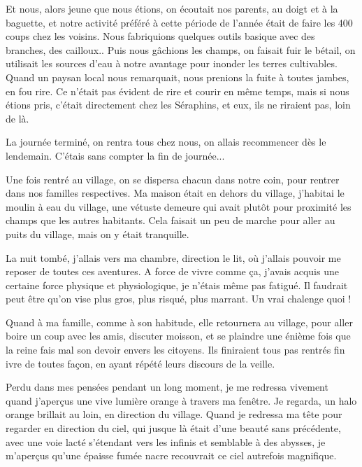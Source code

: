 \documentclass{book}
\begin{document}
Et nous, alors jeune que nous étions, on écoutait nos parents, au doigt et à la baguette, et notre activité préféré à cette période de l'année était de faire les 400 coups chez les voisins. Nous fabriquions quelques outils basique avec des branches, des cailloux.. Puis nous gâchions les champs, on faisait fuir le bétail, on utilisait les sources d'eau à notre avantage pour inonder les terres cultivables. Quand un paysan local nous remarquait, nous prenions la fuite à toutes jambes, en fou rire. Ce n'était pas évident de rire et courir en même temps, mais si nous étions pris, c'était directement chez les Séraphins, et eux, ils ne riraient pas, loin de là.\newline

La journée terminé, on rentra tous chez nous, on allais recommencer dès le lendemain. C'étais sans compter la fin de journée...\newline

Une fois rentré au village, on se dispersa chacun dans notre coin, pour rentrer dans nos familles respectives. Ma maison était en dehors du village, j'habitai le moulin à eau du village, une vétuste demeure qui avait plutôt pour proximité les champs que les autres habitants. Cela faisait un peu de marche pour aller au puits du village, mais on y était tranquille.\newline

La nuit tombé, j'allais vers ma chambre, direction le lit, où j'allais pouvoir me reposer de toutes ces aventures. A force de vivre comme ça, j'avais acquis une certaine force physique et physiologique, je n'étais même pas fatigué. Il faudrait peut être qu'on vise plus gros, plus risqué, plus marrant. Un vrai chalenge quoi !\newline

Quand à ma famille, comme à son habitude, elle retournera au village, pour aller boire un coup avec les amis, discuter moisson, et se plaindre une énième fois que la reine fais mal son devoir envers les citoyens. Ils finiraient tous pas rentrés fin ivre de toutes façon, en ayant répété leurs discours de la veille.\newline

Perdu dans mes pensées pendant un long moment, je me redressa vivement quand j'aperçus une vive lumière orange à travers ma fenêtre. Je regarda, un halo orange brillait au loin, en direction du village. Quand je redressa ma tête pour regarder en direction du ciel, qui jusque là était d'une beauté sans précédente, avec une voie lacté s'étendant vers les infinis et semblable à des abysses, je m'aperçus qu'une épaisse fumée nacre recouvrait ce ciel autrefois magnifique.\newline
\end{document}
